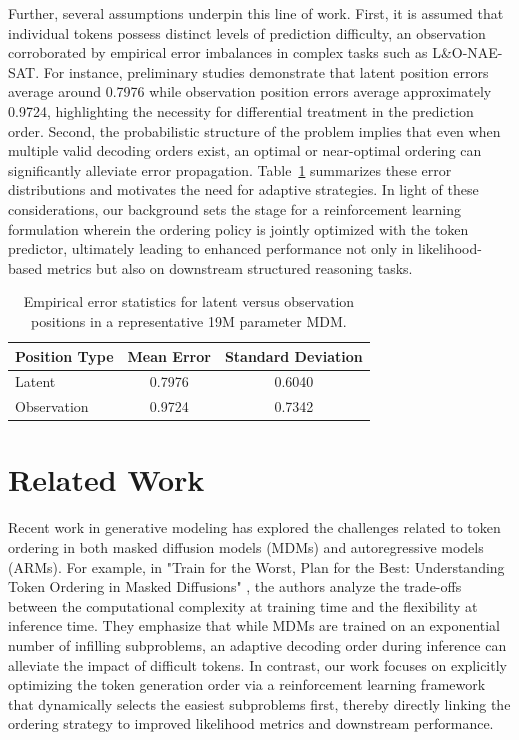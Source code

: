 \documentclass{article} %
\begin{document}
Further, several assumptions underpin this line of work. First, it is assumed that individual tokens possess distinct levels of prediction difficulty, an observation corroborated by empirical error imbalances in complex tasks such as L\&O-NAE-SAT. For instance, preliminary studies demonstrate that latent position errors average around 0.7976 while observation position errors average approximately 0.9724, highlighting the necessity for differential treatment in the prediction order. Second, the probabilistic structure of the problem implies that even when multiple valid decoding orders exist, an optimal or near-optimal ordering can significantly alleviate error propagation. Table~\ref{tab:error} summarizes these error distributions and motivates the need for adaptive strategies. In light of these considerations, our background sets the stage for a reinforcement learning formulation wherein the ordering policy is jointly optimized with the token predictor, ultimately leading to enhanced performance not only in likelihood-based metrics but also on downstream structured reasoning tasks.

\begin{table}[h]
\centering
\begin{tabular}{lcc}
\hline
Position Type  & Mean Error & Standard Deviation \\
\hline
Latent         & 0.7976     & 0.6040 \\
Observation    & 0.9724     & 0.7342 \\
\hline
\end{tabular}
\caption{Empirical error statistics for latent versus observation positions in a representative 19M parameter MDM.}
\label{tab:error}
\end{table}

\section{Related Work}
Recent work in generative modeling has explored the challenges related to token ordering in both masked diffusion models (MDMs) and autoregressive models (ARMs). For example, in "Train for the Worst, Plan for the Best: Understanding Token Ordering in Masked Diffusions" \cite{kim2025train}, the authors analyze the trade-offs between the computational complexity at training time and the flexibility at inference time. They emphasize that while MDMs are trained on an exponential number of infilling subproblems, an adaptive decoding order during inference can alleviate the impact of difficult tokens. In contrast, our work focuses on explicitly optimizing the token generation order via a reinforcement learning framework that dynamically selects the easiest subproblems first, thereby directly linking the ordering strategy to improved likelihood metrics and downstream performance.
\end{document}
